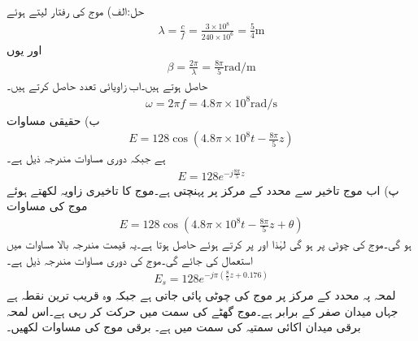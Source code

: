 حل:الف) موج کی رفتار  لیتے ہوئے 
\begin{align*}
\lambda=\frac{c}{f}=\frac{3\times 10^8}{240\times 10^6}=\frac{5}{4}\si{\meter}
\end{align*}
اور یوں
\begin{align*}
\beta=\frac{2\pi}{\lambda}=\frac{8\pi}{5}\si{\radian \per\meter}
\end{align*}
حاصل ہوتے ہیں۔اب زاویائی تعدد حاصل کرتے ہیں۔
\begin{align*}
\omega= 2\pi f =4.8\pi \times 10^{8} \si{\radian \per \second}
\end{align*}
ب) حقیقی مساوات 
\begin{align*}
E=128 \cos \left(4.8\pi \times 10^8 t -\frac{8\pi }{5} z \right)
\end{align*}
ہے جبکہ دوری مساوات مندرجہ ذیل ہے۔
\begin{align*}
E=128 e^{-j\frac{8\pi }{5} z}
\end{align*}
پ) اب موج تاخیر سے محدد کے مرکز پر پہنچتی ہے۔موج کا تاخیری زاویہ  لکھتے ہوئے موج کی مساوات
\begin{align*}
E=128 \cos \left(4.8\pi \times 10^8 t -\frac{8\pi }{5} z +\theta \right)
\end{align*}
ہو گی۔موج کی چوٹی  پر ہو گی لہٰذا  اور  پر کرتے ہوئے   حاصل ہوتا ہے۔یہ قیمت مندرجہ بالا مساوات میں استعمال کی جائے گی۔موج کی دوری مساوات مندرجہ ذیل ہے۔
\begin{align*}
E_s=128 e^{-j \pi (\frac{8}{5} z +0.176) }
\end{align*} 
لمحہ  پہ محدد کے مرکز پر موج کی چوٹی  پائی جاتی ہے جبکہ  وہ قریب ترین نقطہ ہے جہاں میدان صفر کے برابر ہے۔موج گھٹے  کی سمت میں حرکت کر رہی ہے۔اس لمحہ برقی میدان اکائی
 سمتیہ  کی سمت میں ہے۔ برقی موج کی مساوات لکھیں۔

